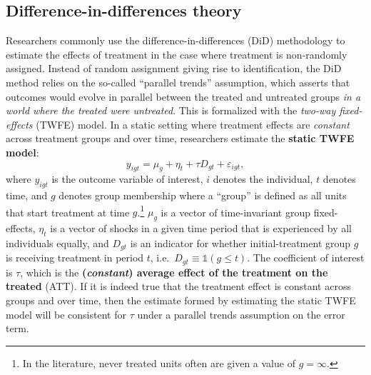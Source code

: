 \hypertarget{difference-in-differences-theory}{%
\subsection{Difference-in-differences theory}\label{difference-in-differences-theory}}

Researchers commonly use the difference-in-differences (DiD) methodology to estimate the effects of treatment in the case where treatment is non-randomly assigned. Instead of random assignment giving rise to identification, the DiD method relies on the so-called ``parallel trends'' assumption, which asserts that outcomes would evolve in parallel between the treated and untreated groups \emph{in a world where the treated were untreated}. This is formalized with the \emph{two-way fixed-effects} (TWFE) model. In a static setting where treatment effects are \emph{constant} across treatment groups and over time, researchers estimate the \textbf{static TWFE model}:
\begin{equation}\label{eq:twfe}
  y_{igt} = \mu_g + \eta_t + \tau D_{gt} + \varepsilon_{igt},
\end{equation}
where \(y_{igt}\) is the outcome variable of interest, \(i\) denotes the individual, \(t\) denotes time, and \(g\) denotes group membership where a ``group'' is defined as all units that start treatment at time \(g\).\footnote{In the literature, never treated units often are given a value of \(g = \infty\).} \(\mu_g\) is a vector of time-invariant group fixed-effects, \(\eta_t\) is a vector of shocks in a given time period that is experienced by all individuals equally, and \(D_{gt}\) is an indicator for whether initial-treatment group \(g\) is receiving treatment in period \(t\), i.e.~\(D_{gt} \equiv \mathbb{1}(g \leq t)\). The coefficient of interest is \(\tau\), which is the \textbf{(\emph{constant}) average effect of the treatment on the treated} (ATT). If it is indeed true that the treatment effect is constant across groups and over time, then the estimate formed by estimating the static TWFE model will be consistent for \(\tau\) under a parallel trends assumption on the error term.

